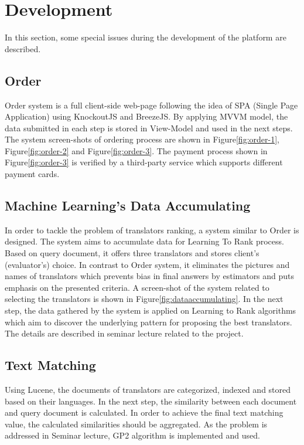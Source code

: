 \section{Development}
\label{sec:development}
In this section, some special issues during the development of the platform are described.

\subsection{Order}
Order system is a full client-side web-page following the idea of SPA (Single Page Application) using KnockoutJS and BreezeJS. By applying MVVM model, the data submitted in each step is stored in View-Model and used in the next steps. The system screen-shots of ordering process are shown in Figure\ref{fig:order-1}, Figure\ref{fig:order-2} and Figure\ref{fig:order-3}.  The payment process shown in Figure\ref{fig:order-3} is verified by a third-party service which supports different payment cards.

\subsection{Machine Learning's Data Accumulating}
In order to tackle the problem of translators ranking, a system similar to Order is designed. The system aims to accumulate data for Learning To Rank process. Based on query document, it offers three translators and stores client's (evaluator's) choice. In contrast to Order system, it eliminates the pictures and names of translators which prevents bias in final answers by estimators and puts emphasis on the presented criteria. A screen-shot of the system related to selecting the translators is shown in Figure\ref{fig:dataaccumulating}. In the next step, the data gathered by the system is applied on Learning to Rank algorithms which aim to discover the underlying pattern for proposing the best translators. The details are described in seminar lecture related to the project. 

\subsection{Text Matching}
Using Lucene, the documents of translators are categorized, indexed and stored based on their languages. In the next step, the similarity between each document and query document is calculated. In order to achieve the final text matching value, the calculated similarities should be aggregated. As the problem is addressed in Seminar lecture, GP2\cite{gp2} algorithm is implemented and used.

